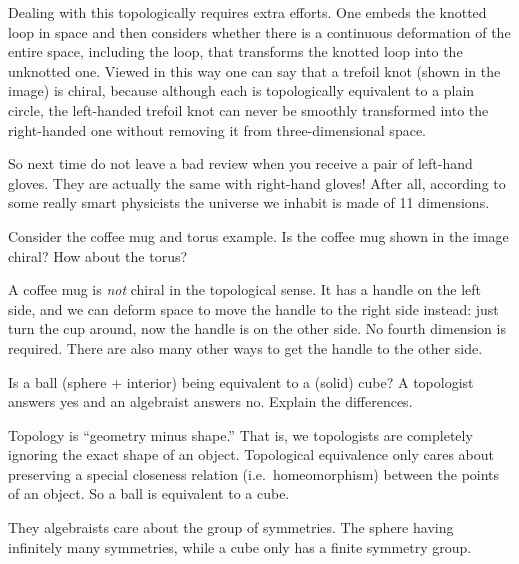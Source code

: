 Dealing with this topologically requires extra efforts.
One embeds the knotted loop in space and then considers whether there is a continuous deformation of the entire space, including the loop, that transforms the knotted loop into the unknotted one. Viewed in this way one can say that a trefoil knot (shown in the image) is chiral, 
because although each is topologically equivalent to a plain circle, the left-handed trefoil knot can never be smoothly transformed into the right-handed one
without removing it from three-dimensional space.

So next time do not leave a bad review when you receive a pair of left-hand gloves. They are actually the same with right-hand gloves! 
After all, according to some really smart physicists the universe we inhabit is made of 11 dimensions.


\begin{qst}
  Consider the coffee mug and torus example. Is the coffee mug shown in the image
  chiral? How about the torus?
\end{qst}

\begin{asw}
  A coffee mug is \textit{not} chiral in the topological sense. 
  It has a handle on the left side, and we can deform space to move the handle to the right side instead: just turn the cup around, now the handle is on the other side. No fourth dimension is required. 
  There are also many other ways to get the handle to the other side.
\end{asw}

\begin{qst}
  Is a ball (sphere + interior) being equivalent to a (solid) cube? 
  A topologist answers yes and an algebraist answers no. Explain the differences.
\end{qst}

\begin{asw}
  Topology is ``geometry minus shape.'' That is, we topologists are completely ignoring the exact shape of an object.   Topological equivalence only cares about preserving a special closeness relation (i.e.\ homeomorphism) between the points of an object.
  So a ball is equivalent to a cube.

  They algebraists care about the group of symmetries.
  The sphere having infinitely many symmetries, while a cube only has a finite symmetry group.
\end{asw}


